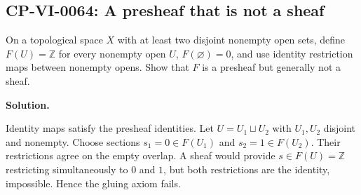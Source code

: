 
\subsection*{CP-VI-0064: A presheaf that is not a sheaf}

On a topological space $X$ with at least two disjoint nonempty open sets, define $F(U)=\mathbb Z$ for every nonempty open $U$, $F(\varnothing)=0$, and use identity restriction maps between nonempty opens. Show that $F$ is a presheaf but generally not a sheaf.

\medskip
\noindent\textbf{Solution.}

Identity maps satisfy the presheaf identities. Let $U=U_1\sqcup U_2$ with $U_1,U_2$ disjoint and nonempty. Choose sections $s_1=0\in F(U_1)$ and $s_2=1\in F(U_2)$. Their restrictions agree on the empty overlap. A sheaf would provide $s\in F(U)=\mathbb Z$ restricting simultaneously to $0$ and $1$, but both restrictions are the identity, impossible. Hence the gluing axiom fails.
